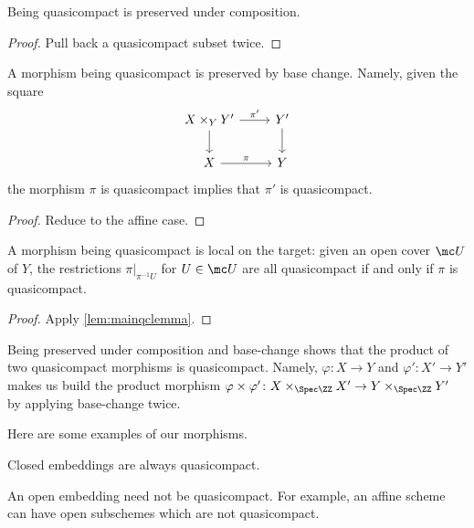 \documentclass[../notes.tex]{subfiles}
\begin{document}
\begin{corollary}
	Being quasicompact is preserved under composition.
\end{corollary}
\begin{proof}
	Pull back a quasicompact subset twice.
\end{proof}
\begin{corollary}
	A morphism being quasicompact is preserved by base change. Namely, given the square
	\[\begin{tikzcd}
		{X\times_YY'} & {Y'} \\
		X & Y
		\arrow["\pi", from=2-1, to=2-2]
		\arrow["{\pi'}", from=1-1, to=1-2]
		\arrow[from=1-1, to=2-1]
		\arrow[from=1-2, to=2-2]
	\end{tikzcd}\]
	the morphism $\pi$ is quasicompact implies that $\pi'$ is quasicompact.
\end{corollary}
\begin{proof}
	Reduce to the affine case.
\end{proof}
\begin{corollary}
	A morphism being quasicompact is local on the target: given an open cover $\mc U$ of $Y$, the restrictions $\pi|_{\pi^{-1}U}$ for $U\in\mc U$ are all quasicompact if and only if $\pi$ is quasicompact.
\end{corollary}
\begin{proof}
	Apply \autoref{lem:mainqclemma}.
\end{proof}
\begin{remark}
	Being preserved under composition and base-change shows that the product of two quasicompact morphisms is quasicompact. Namely, $\varphi\colon X\to Y$ and $\varphi'\colon X'\to Y'$ makes us build the product morphism $\varphi\times\varphi'\colon X\times_{\Spec\ZZ}X'\to Y\times_{\Spec\ZZ}Y'$ by applying base-change twice.
\end{remark}
Here are some examples of our morphisms.
\begin{example}
	Closed embeddings are always quasicompact.
\end{example}
\begin{nex}
	An open embedding need not be quasicompact. For example, an affine scheme can have open subschemes which are not quasicompact.
\end{nex}
\end{document}

